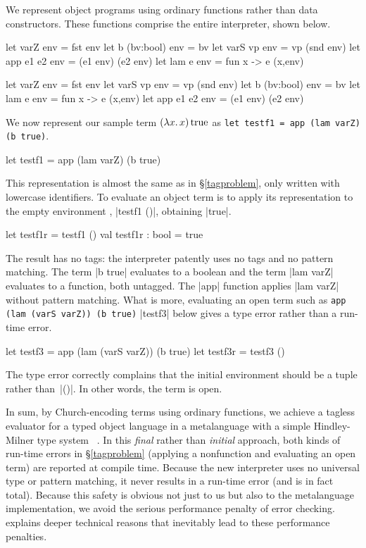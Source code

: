 We represent object programs using ordinary functions rather than
data constructors.  These functions comprise the entire interpreter, shown
below.
\ifshort
\begin{code3}[xleftmargin=0pt]
let varZ env    = fst env       let b (bv:bool) env = bv
let varS vp env = vp (snd env)  let app e1 e2 env   = (e1 env) (e2 env)
let lam e env   = fun x -> e (x,env)
\end{code3}
\else
\begin{code}
let varZ env        = fst env
let varS vp env     = vp (snd env)
let b (bv:bool) env = bv
let lam e env       = fun x -> e (x,env)
let app e1 e2 env   = (e1 env) (e2 env)
\end{code}
\fi
We now represent our sample term $(\mathopen{\lambda\mathord{x}.\,}x)\mathinner{\mathrm{true}}$ as
\ifshort
\texttt{let testf1 = app (lam varZ) (b true)}.
\else
\begin{code}
let testf1 = app (lam varZ) (b true)
\end{code}
\fi
This representation is almost the same as in \S\ref{tagproblem}, only
written with lowercase identifiers. To evaluate an object term is to
apply its representation to the empty environment\ifshort
, |testf1 ()|, obtaining |true|\fi.
\ifshort\else
\begin{code}
let testf1r = testf1 ()
val testf1r : bool = true
\end{code}
\fi
The result has no tags: the interpreter patently uses no tags and no
pattern matching. The term |b true| evaluates to a boolean and the term
|lam varZ| evaluates to a function, both untagged. The |app| function
applies |lam varZ| without pattern matching. What is more, evaluating an
open term such as
\ifshort
\texttt{app (lam (varS varZ)) (b true)}
\else
|testf3| below
\fi
gives a type error rather than a run-time error.
\ifshort\else
\begin{code}
let testf3 = app (lam (varS varZ)) (b true)
let testf3r = testf3 ()
\end{code}
\fi
The type error correctly complains
that the initial environment should be a tuple rather than~|()|.
In other words, the term is open.

In sum, by Church\hyp encoding terms using ordinary functions, we
achieve a tagless evaluator for a typed object language in a
metalanguage with a simple 
\ifshort
Hindley-Milner \fi
type system\ifshort\else\ \cite{hindley-principal,milner-theory}\fi
.  In this \emph{final} rather
than \emph{initial} approach, both kinds of run-time errors in
\S\ref{tagproblem} (applying a nonfunction and evaluating an open
term) are reported at compile time. Because the new interpreter
uses no universal type or pattern matching, it never results in a
run-time error (and is in fact total).  Because this safety is obvious
not just to us but also to the metalanguage implementation, we avoid
the serious performance penalty \cite{WalidICFP02} of error checking.
 explains deeper technical reasons that
inevitably lead to these performance penalties.


